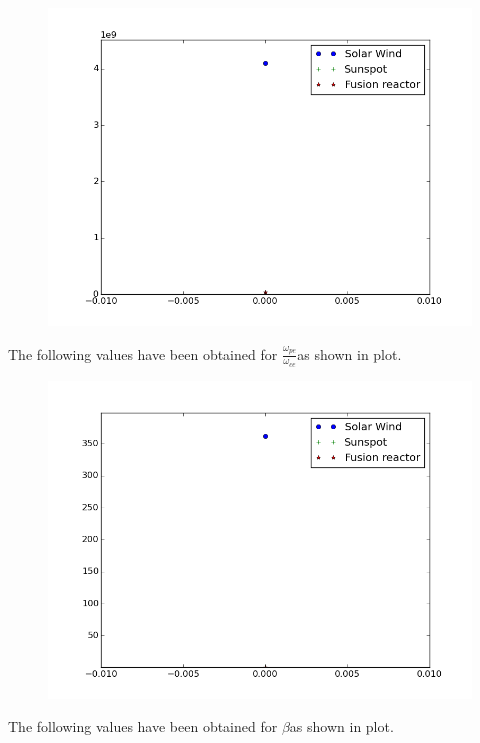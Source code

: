 \documentclass[11pt, a4paper]{article}
\begin{document}
\begin{figure}[H]
 \centering
 \includegraphics[width = \textwidth]{q1_2.png}
\end{figure}
The following values have been obtained for $\frac{\omega_{pe}}{\omega_{ce}}$as shown in plot.
\begin{figure}[H]
 \centering
 \includegraphics[width = \textwidth]{q1_3.png}
\end{figure}
The following values have been obtained for $\beta$as shown in plot.
\end{document}
